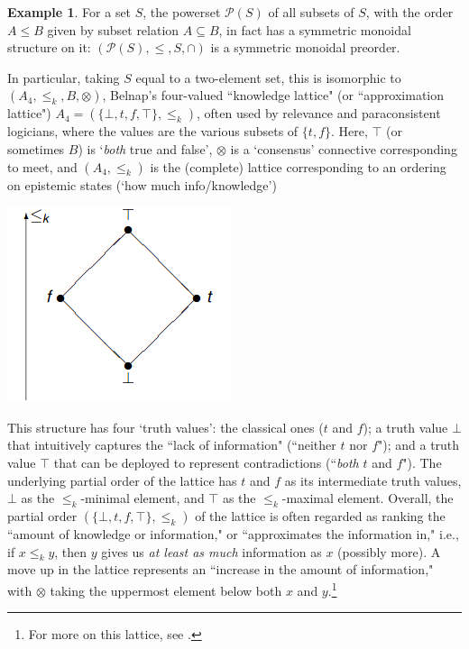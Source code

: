 \documentclass[11pt]{book}
\theoremstyle{definition}
\newtheorem{example}{Example}[section]
\theoremstyle{definition}
\theoremstyle{definition}
\theoremstyle{theorem}
\theoremstyle{definition}
\begin{document}
\begin{example}
	For a set $S$, the powerset $\mathcal{P}(S)$ of all subsets of $S$, with the order $A \leq B$ given by subset relation $A \subseteq  B$, in fact has a symmetric monoidal structure on it: $(\mathcal{P}(S), \leq, S, \cap)$ is a symmetric monoidal preorder. \par 
	In particular, taking $S$ equal to a two-element set, this is isomorphic to $(A_4, \leq_k, B, \otimes)$, Belnap's four-valued ``knowledge lattice" (or ``approximation lattice") $A_4 = (\{\bot, t, f, \top\}, \leq_k)$, often used by relevance and paraconsistent logicians, where the values are the various subsets of $\{t,f\}$. Here, $\top$ (or sometimes $B$) is `\textit{both} true and false', $\otimes$ is a `consensus' connective corresponding to meet, and $(A_4, \leqslant_k)$ is the (complete) lattice corresponding to an ordering on epistemic states (`how much info/knowledge')
	\begin{center}
		\includegraphics[scale=0.4]{L4.png}
	\end{center}
This structure has four `truth values': the classical ones ($t$ and $f$); a truth value $\bot$ that intuitively captures the ``lack of information" (``neither $t$ nor $f$"); and a truth value $\top$ that can be deployed to represent contradictions (``\textit{both} $t$ and $f$"). The underlying partial order of the lattice has $t$ and $f$ as its intermediate truth values, $\bot$ as the $\leq_k$-minimal element, and $\top$ as the $\leq_k$-maximal element. Overall, the partial order $(\{\bot, t, f, \top\}, \leq_k)$ of the lattice is often regarded as ranking the ``amount of knowledge or information," or ``approximates the information in," i.e., if $x \leq_k y$, then $y$ gives us \textit{at least as much} information as $x$ (possibly more). A move up in the lattice represents an ``increase in the amount of information," with $\otimes$ taking the uppermost element below both $x$ and $y$.\footnote{For more on this lattice, see \cite{belnap_how_1992}.} 
\end{example}
\end{document}
